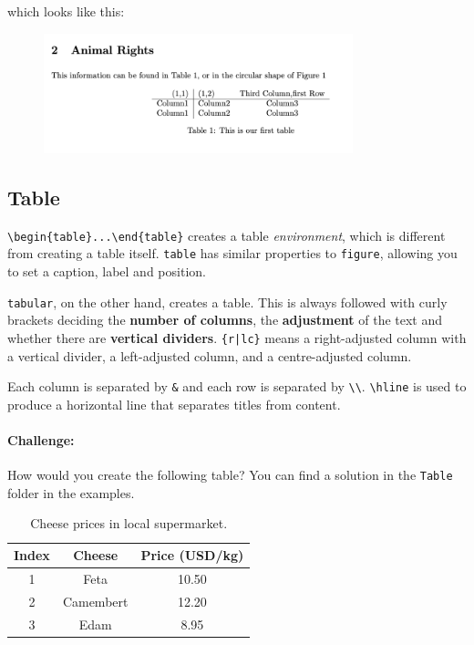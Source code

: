 
which looks like this:
\begin{figure}[h]
    \centering
        \includegraphics[width=0.8\textwidth]{figures/tables.png}
    \label{fig:tables}
\end{figure}

\subsection{Table}
\verb|\begin{table}...\end{table}| creates a table \emph{environment}, which is different from creating a table itself.
\verb|table| has similar properties to \verb|figure|, allowing you to set a caption, label and position.

\verb|tabular|, on the other hand, creates a table. This is always followed with curly brackets deciding the \textbf{number of columns}, the \textbf{adjustment} of the text and whether there are \textbf{vertical dividers}.
\verb!{r|lc}! means a right-adjusted column with a vertical divider, a left-adjusted column, and a centre-adjusted column.

Each column is separated by \verb|&| and each row is separated by \verb|\\|. \verb|\hline| is used to produce a horizontal line that separates titles from content.

\paragraph{Challenge:}
How would you create the following table? You can find a solution in the \texttt{Table} folder in the examples.
\begin{table}[h]
\centering
\begin{tabular}{ccc}
    Index & Cheese & Price (USD/kg) \\ \hline
    1 & Feta & 10.50 \\
    2 & Camembert & 12.20 \\
    3 & Edam & 8.95 
\end{tabular}
    \caption{Cheese prices in local supermarket.}
\end{table}

